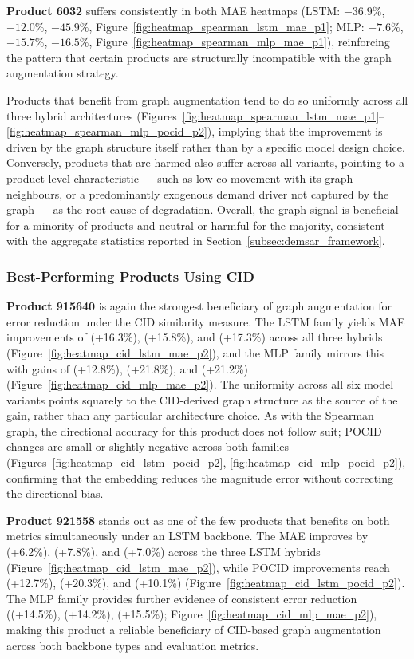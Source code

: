 \textbf{Product 6032} suffers consistently in both MAE heatmaps
(LSTM: \(-36.9\%\), \(-12.0\%\), \(-45.9\%\), Figure~\ref{fig:heatmap_spearman_lstm_mae_p1};
MLP: \(-7.6\%\), \(-15.7\%\), \(-16.5\%\), Figure~\ref{fig:heatmap_spearman_mlp_mae_p1}),
reinforcing the pattern that certain products are structurally incompatible with
the graph augmentation strategy.

Products that benefit from graph augmentation tend to do so uniformly across all
three hybrid architectures (Figures~\ref{fig:heatmap_spearman_lstm_mae_p1}--\ref{fig:heatmap_spearman_mlp_pocid_p2}),
implying that the improvement is driven by the graph structure itself rather than
by a specific model design choice. Conversely, products that are harmed also
suffer across all variants, pointing to a product-level characteristic — such as
low co-movement with its graph neighbours, or a predominantly exogenous demand
driver not captured by the graph — as the root cause of degradation. Overall, the
graph signal is beneficial for a minority of products and neutral or harmful for
the majority, consistent with the aggregate statistics reported in
Section~\ref{subsec:demsar_framework}.

\subsubsection*{Best-Performing Products Using CID}

\textbf{Product 915640} is again the strongest beneficiary of graph augmentation for error reduction under the CID similarity measure. The LSTM family yields MAE improvements of (+16.3\%), (+15.8\%), and (+17.3\%) across all three hybrids (Figure~\ref{fig:heatmap_cid_lstm_mae_p2}), and the MLP family mirrors this with gains of (+12.8\%), (+21.8\%), and (+21.2\%) (Figure~\ref{fig:heatmap_cid_mlp_mae_p2}). The uniformity across all six model variants points squarely to the CID-derived graph structure as the source of the gain, rather than any particular architecture choice. As with the Spearman graph, the directional accuracy for this product does not follow suit; POCID changes are small or slightly negative across both families (Figures~\ref{fig:heatmap_cid_lstm_pocid_p2}, \ref{fig:heatmap_cid_mlp_pocid_p2}), confirming that the embedding reduces the magnitude error without correcting the directional bias.

\textbf{Product 921558} stands out as one of the few products that benefits on both metrics simultaneously under an LSTM backbone. The MAE improves by (+6.2\%), (+7.8\%), and (+7.0\%) across the three LSTM hybrids (Figure~\ref{fig:heatmap_cid_lstm_mae_p2}), while POCID improvements reach (+12.7\%), (+20.3\%), and (+10.1\%) (Figure~\ref{fig:heatmap_cid_lstm_pocid_p2}). The MLP family provides further evidence of consistent error reduction ((+14.5\%), (+14.2\%), (+15.5\%); Figure~\ref{fig:heatmap_cid_mlp_mae_p2}), making this product a reliable beneficiary of CID-based graph augmentation across both backbone types and evaluation metrics.

